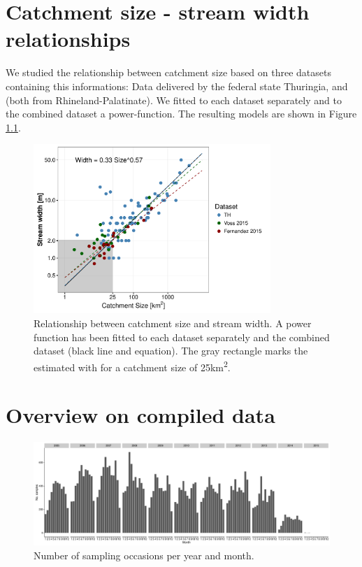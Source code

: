 \documentclass[pdftex,a4paper]{scrreprt}
\begin{document}
\chapter{Catchment size - stream width relationships}
We studied the relationship between catchment size based on three datasets containing this informations:
Data delivered by the federal state Thuringia, \citet{vos_organic_2015} and \citet{fernandez_effects_2015} (both from Rhineland-Palatinate).
We fitted to each dataset separately and to the combined dataset a power-function.
The resulting models are shown in Figure \ref{fig:size_width}. 


\begin{figure}[h]
	\centering
	\includegraphics[width = 0.8\textwidth]{width_size}
	\caption[Relationship between catchment size and stream width.]{Relationship between catchment size and stream width. A power function has been fitted to each dataset separately and the combined dataset (black line and equation). The gray rectangle marks the estimated with for a catchment size of 25km\textsuperscript{2}.}
	\label{fig:size_width}
\end{figure}




\chapter{Overview on compiled data}


\begin{figure}[h]
	\centering
	\includegraphics[width = \textwidth]{temporal}
	\caption{Number of sampling occasions per year and month.}
	\label{fig:temporal}
\end{figure}
\end{document}

